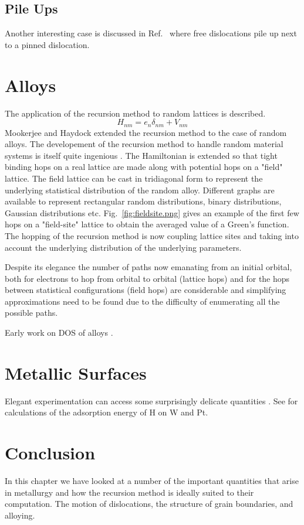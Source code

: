 \subsection{Pile Ups}
Another interesting case is discussed in Ref.~\cite{eshelby} 
where free dislocations pile up next to a pinned dislocation.

\section{Alloys}
The application of the recursion method to random lattices is described.
\cite{glaser81}
%
\begin{equation}
H_{nm} = e_{n}\delta_{nm} + V_{nm}
\end{equation}
%
Mookerjee and Haydock extended the recursion method to the case of random alloys.
The developement of the recursion method to handle random material systems is 
itself quite ingenious \cite{mookerjee, haydock74}. The Hamiltonian is extended
so that tight binding hops on a real lattice are made along with potential hops
on a "field" lattice. The field lattice can be cast in tridiagonal form to represent
the underlying statistical distribution of the random alloy. Different graphs are available
to represent rectangular random distributions, binary distributions, Gaussian distributions
etc. Fig.~\ref{fig:fieldsite.png} gives an example of the first few hops on a "field-site" 
lattice to obtain the averaged value of a Green's function. The hopping of the recursion method
is now coupling lattice sites and taking into account the underlying distribution of 
the underlying parameters.

Despite its elegance the number of paths now emanating from an initial orbital, both
for electrons to hop from orbital to orbital (lattice hops) and for the hops between 
statistical configurations (field hops) are considerable and simplifying approximations 
need to be found due to the difficulty of enumerating all the possible paths.

Early work on DOS of alloys \cite{cubiotti77}. 

\section{Metallic Surfaces}
Elegant experimentation can access some surprisingly delicate quantities \cite{whipp34}.
See \cite{bullet77} for calculations of the adsorption energy of H on W and Pt.

\section{Conclusion}
In this chapter we have looked at a number of the important quantities that
arise in metallurgy and how the recursion method is ideally suited to their 
computation. The motion of dislocations, the structure of grain boundaries, 
and alloying. 

